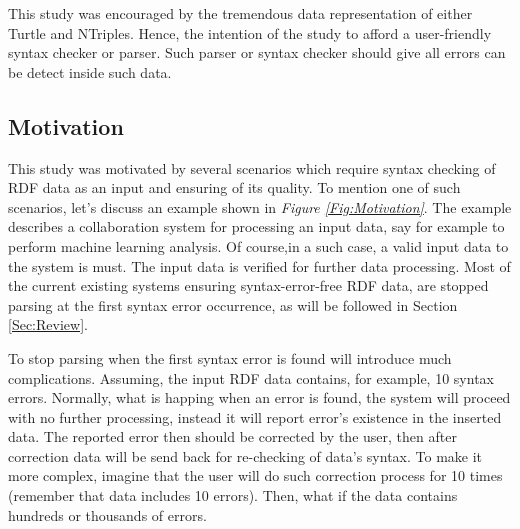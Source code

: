 \vspace{5mm} %

This study was encouraged by the tremendous data representation of either Turtle and NTriples. Hence, the intention of the study to afford a user-friendly syntax checker or parser. Such parser or syntax checker should give all errors can be detect inside such data.


			



\subsection{Motivation}

This study was motivated by several scenarios which require syntax checking of RDF data as an input and ensuring of its quality. To mention one of such scenarios, let's discuss an example shown in {\it Figure \ref{Fig:Motivation}}. The example describes a collaboration system for processing an input data, say for example to perform machine learning analysis. Of course,in a such case, a valid input data to the system is must. The input data is verified for further data processing. Most of the current existing systems  ensuring syntax-error-free RDF data, are stopped parsing at the first syntax error occurrence, as will be followed in Section \ref{Sec:Review}.
	\vspace{5mm} %
	\par
	To stop parsing when the first syntax error is found will introduce much complications. Assuming, the input RDF data contains, for example, 10 syntax errors. Normally, what is happing when an error is found, the system will proceed with no further processing, instead it will report error's existence in the inserted data. The reported error then should be corrected by the user, then after correction data will be send back for re-checking of data's syntax. To make it more complex, imagine that the user will do such correction process for 10 times (remember that data includes 10 errors). Then, what if the data contains hundreds or thousands of errors. 

